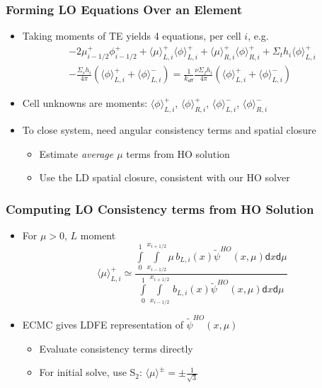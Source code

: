 \documentclass[xcolor=dvipsnames]{beamer}
\newcommand{\keff}[0]{\ensuremath{{k}_{\textsf{eff}}} }
\newcommand{\colb}[1]{{\color{blue} #1}}
\newlength{\wideitemsep}
\let\olditem\item
\renewcommand{\item}{\setlength{\itemsep}{\wideitemsep}\olditem}
\renewcommand{\d}{\mathsf{d}}
\newcommand{\mom}[1]{\langle #1 \rangle}
\newcommand{\xl}{{x_{i-1/2}}}
\newcommand{\xr}{{x_{i+1/2}}}
\begin{document}
\begin{frame}
    \frametitle{Forming LO Equations Over an Element}
    \begin{itemize}
        \item Taking moments of TE yields \colb{4 equations}, per cell $i$, e.g.
        {\small
        \begin{multline*}\label{lo_tran}
    -2{\mu}_{i-1/2}^{+} \phi_{i-1/2}^{+} + \mom {\mu}_{L,i}^{+}
  \mom{\phi}_{L,i}^{+}
  +  \mom\mu_{R,i}^{+}
  \mom{\phi}_{R,i}^{+} + \Sigma_t h_i \mom{\phi}_{L,i}^+ \\-  \frac{\Sigma_s h_i}{4\pi} \left( \mom{\phi}_{L,i}^{+} +
  \mom\phi_{L,i}^{-}\right) = \frac{1}{\keff} \frac{\nu \Sigma_fh_i}{4\pi}\left( \mom{\phi}_{L,i}^{+} +
  \mom\phi_{L,i}^{-}\right)
\end{multline*}}
        \item Cell unknowns are \colb{moments}: $\mom{\phi}_{L,i}^{+}$, $\mom{\phi}_{R,i}^{+}$,
        $\mom{\phi}_{L,i}^{-}$, $\mom{\phi}_{R,i}^{-}$ 

    \item \pause To close system, need angular consistency terms  and spatial
        closure
    \begin{itemize} 
        \item Estimate \emph{average $\mu$} terms from HO solution
        \item Use the LD spatial closure, consistent with our HO solver
    \end{itemize}
    \end{itemize}

\end{frame}


\begin{frame}
    \frametitle{Computing LO Consistency terms from HO Solution}
    \begin{itemize}
        \item For $\mu>0$, $L$ moment
            \begin{equation*}\label{consistency}
\mom{{\mu}}_{L,i}^{+} \simeq \frac{\displaystyle 
 \int\limits_0^1 \int\limits_\xl^\xr \mu \, b_{L,i}(x) \tilde \psi^{HO}(x,\mu) \d x \d \mu } 
{\displaystyle \int\limits_0^1 \int\limits_\xl^\xr \, b_{L,i}(x)
\tilde \psi^{HO}(x,\mu) \d x \d \mu } 
    \end{equation*}
\item \pause ECMC gives LDFE representation of $\tilde  \psi^{HO}(x,\mu)$
    \begin{itemize} 
        \item Evaluate consistency terms directly
        \item For initial solve, use S$_2$: $\mom{\mu}^\pm = \pm \frac{1}{\sqrt{3}}$ 
    \end{itemize}
    \end{itemize}
\end{frame}
\end{document}
